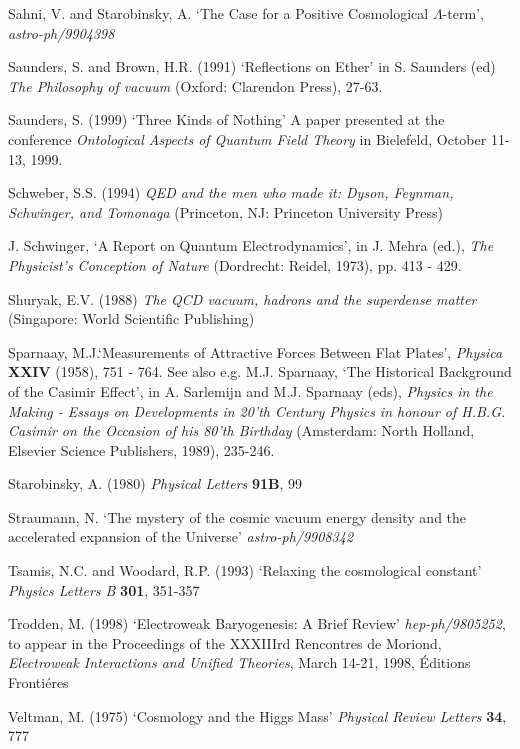 \documentclass[12pt]{article}
\begin{document}
\begin{thebibliography}{X}
Sahni, V. and Starobinsky, A. `The Case for a Positive
Cosmological $\Lambda$-term', {\em astro-ph/9904398}

 Saunders, S.  and  Brown, H.R. (1991) 
`Reflections on Ether'  
in  S. Saunders (ed) {\em  The
Philosophy of vacuum} (Oxford: Clarendon Press), 27-63.

 Saunders, S. (1999) `Three Kinds of Nothing'
A paper presented at the conference {\em Ontological Aspects of
Quantum Field Theory} in Bielefeld, October 11-13, 1999.

 Schweber, S.S. (1994)
{\em QED and the men who made it: Dyson, Feynman, Schwinger,
and Tomonaga} (Princeton, NJ: Princeton University Press)

 J. Schwinger, `A Report on Quantum Electrodynamics',
in J. Mehra (ed.), {\em The Physicist's Conception of
Nature} (Dordrecht: Reidel, 1973), pp. 413 - 429. 

Shuryak, E.V. (1988) {\em The QCD vacuum, hadrons
and the superdense matter} (Singapore: World Scientific Publishing)

Sparnaay, M.J.`Measurements of Attractive Forces Between Flat
Plates', {\em Physica} {\bf XXIV} (1958), 751 - 764. See also e.g.
M.J. Sparnaay, `The Historical Background of the Casimir Effect',
in A. Sarlemijn and M.J. Sparnaay (eds),
{\em Physics in the Making - Essays on Developments in 20'th Century
Physics in honour of H.B.G. Casimir on the Occasion of his 80'th
Birthday} (Amsterdam: North Holland, Elsevier Science Publishers,
1989), 235-246.

 Starobinsky, A. (1980)  
{\em Physical Letters} {\bf 91B}, 99

Straumann, N. `The mystery of the cosmic vacuum energy density
and the accelerated expansion of the Universe' {\em astro-ph/9908342}

 Tsamis, N.C. and Woodard, R.P. 
(1993) `Relaxing the cosmological constant' {\em Physics Letters B}
{\bf 301}, 351-357

Trodden, M. (1998) `Electroweak Baryogenesis: A Brief Review'
{\em hep-ph/9805252}, to appear in the Proceedings of the XXXIIIrd
Rencontres de Moriond, {\em Electroweak Interactions and Unified
Theories}, March 14-21, 1998, \'Editions Fronti\'eres

Veltman, M. (1975) `Cosmology and the Higgs Mass'
{\em Physical Review Letters} {\bf 34}, 777


\end{thebibliography}
\end{document}

